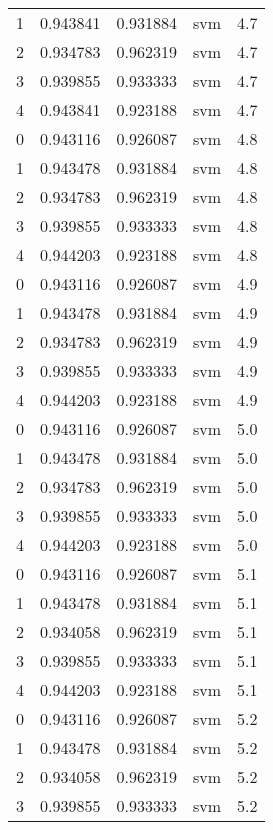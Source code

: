 \begin{tabular}{rrrlr}
     1 & 0.943841 & 0.931884 &      svm &        4.7 \\
     2 & 0.934783 & 0.962319 &      svm &        4.7 \\
     3 & 0.939855 & 0.933333 &      svm &        4.7 \\
     4 & 0.943841 & 0.923188 &      svm &        4.7 \\
     0 & 0.943116 & 0.926087 &      svm &        4.8 \\
     1 & 0.943478 & 0.931884 &      svm &        4.8 \\
     2 & 0.934783 & 0.962319 &      svm &        4.8 \\
     3 & 0.939855 & 0.933333 &      svm &        4.8 \\
     4 & 0.944203 & 0.923188 &      svm &        4.8 \\
     0 & 0.943116 & 0.926087 &      svm &        4.9 \\
     1 & 0.943478 & 0.931884 &      svm &        4.9 \\
     2 & 0.934783 & 0.962319 &      svm &        4.9 \\
     3 & 0.939855 & 0.933333 &      svm &        4.9 \\
     4 & 0.944203 & 0.923188 &      svm &        4.9 \\
     0 & 0.943116 & 0.926087 &      svm &        5.0 \\
     1 & 0.943478 & 0.931884 &      svm &        5.0 \\
     2 & 0.934783 & 0.962319 &      svm &        5.0 \\
     3 & 0.939855 & 0.933333 &      svm &        5.0 \\
     4 & 0.944203 & 0.923188 &      svm &        5.0 \\
     0 & 0.943116 & 0.926087 &      svm &        5.1 \\
     1 & 0.943478 & 0.931884 &      svm &        5.1 \\
     2 & 0.934058 & 0.962319 &      svm &        5.1 \\
     3 & 0.939855 & 0.933333 &      svm &        5.1 \\
     4 & 0.944203 & 0.923188 &      svm &        5.1 \\
     0 & 0.943116 & 0.926087 &      svm &        5.2 \\
     1 & 0.943478 & 0.931884 &      svm &        5.2 \\
     2 & 0.934058 & 0.962319 &      svm &        5.2 \\
     3 & 0.939855 & 0.933333 &      svm &        5.2 \\

\end{tabular}
